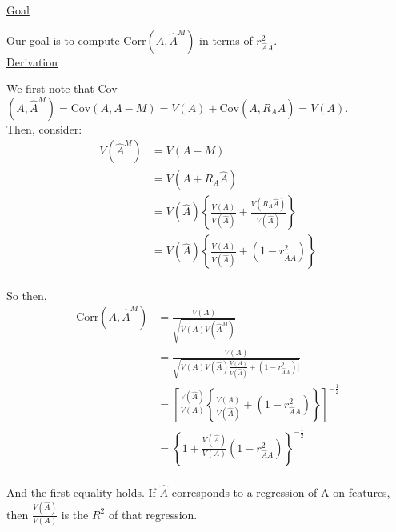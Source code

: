 \documentclass[40pt]{article}
\begin{document}
\underline{Goal}

Our goal is to compute ${\textrm{Corr}}(A, \hat{A}^M)$ in terms of $r_{\hat{A}A}^2$. \\

\underline{Derivation}

We first note that Cov$(A, \hat{A}^M) = \text{Cov}(A, A-M) = V(A) + \text{Cov}(A, R_A \hat{A}) = V(A)$. \\

Then, consider:
\begin{align*}
V(\hat{A}^M) &= V(A - M) \\
&= V(A + R_A \hat{A}) \\
&= V(\hat{A}) \left\{\frac{V(A)}{V(\hat{A})} + \frac{V(R_A \hat{A})}{V(\hat{A})}\right\} \\
&= V(\hat{A}) \left\{\frac{V(A)}{V(\hat{A})} + (1 - r_{\hat{A}A}^2) \right\} \\
\end{align*}



So then, 
\begin{align*}
\textrm{Corr}(A, \hat{A}^M) &= \frac{V(A)}{\sqrt{V(A)V(\hat{A}^M)}}  \\
&= \frac{V(A)}{\sqrt{V(A)V(\hat{A}) \frac{V(A)}{V(\hat{A})} + (1 - r_{\hat{A}A}^2)\Big]}} \\
&=  \left[\frac{V(\hat{A})}{V(A)} \left\{\frac{V(A)}{V(\hat{A})} + (1 - r_{\hat{A}A}^2) \right\} \right]^{-\frac{1}{2}} \\
&= \left\{1 + \frac{V(\hat{A})}{V(A)}(1 - r_{\hat{A}A}^2) \right\}^{-\frac{1}{2}} \\
\end{align*}

And the first equality holds. If $\hat{A}$ corresponds to a regression of A on features, then $\frac{V(\hat{A})}{V(A)}$ is the $R^2$ of that regression. \\
\end{document}
